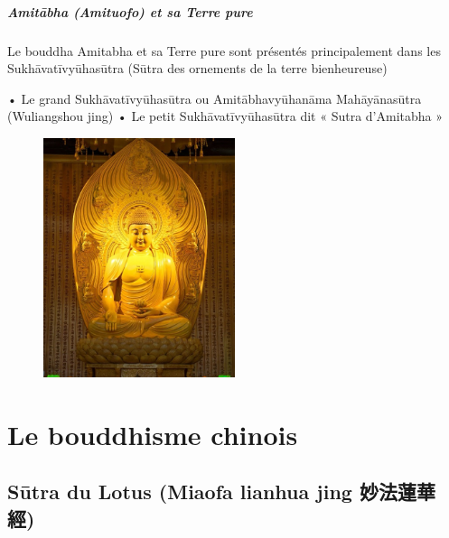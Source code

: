 \paragraph{Amitābha (Amituofo) et sa Terre pure}

Le bouddha Amitabha et sa Terre pure sont présentés principalement dans les Sukhāvatīvyūhasūtra (Sūtra des ornements de la terre bienheureuse)

•	Le grand Sukhāvatīvyūhasūtra ou Amitābhavyūhanāma Mahāyānasūtra (Wuliangshou jing)
•	Le petit Sukhāvatīvyūhasūtra dit « Sutra d’Amitabha »

\begin{figure}
    \centering
    \includegraphics[width=0.5\textwidth]{ConfucianismeTaoismeBouddhismeChinois/BouddhaAmituofo.jpg}

    \label{fig:enter-label}
\end{figure}

\chapter{Le bouddhisme chinois}



\section{Sūtra du Lotus (Miaofa lianhua jing 妙法蓮華經)}



